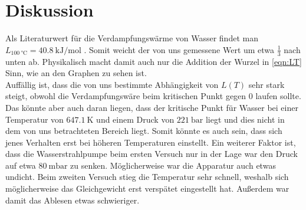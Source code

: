 \documentclass[
  bibliography=totoc,     %
  captions=tableheading,  %
  titlepage=firstiscover, %
]{scrartcl}
\begin{document}
\section{Diskussion}
Als Literaturwert für die Verdampfungswärme von Wasser findet man
$L_{\SI{100}{\celsius}} = \SI{40.8}{\kilo\joule\per\mol}$ \cite{chemst}.
Somit weicht der von uns gemessene Wert um etwa $\frac{1}{3}$ nach unten ab.
Physikalisch macht damit auch nur die Addition der Wurzel in \eqref{eqn:LT} Sinn, wie an den Graphen zu sehen ist.\\
Auffällig ist, dass die von uns bestimmte Abhängigkeit von $L \left( T \right)$ sehr stark steigt, obwohl die
Verdampfungswäre beim kritischen Punkt gegen 0 laufen sollte.
Das könnte aber auch daran liegen, dass der kritische Punkt für Wasser bei einer Temperatur
von $\SI{647.1}{\kelvin}$ und einem Druck von $\SI{221}{\bar}$ liegt \cite{chemth} und dies
nicht in dem von uns betrachteten Bereich liegt. Somit könnte es auch sein, dass sich
jenes Verhalten erst bei höheren Temperaturen einstellt.
Ein weiterer Faktor ist, dass die Wasserstrahlpumpe beim ersten Versuch nur in der Lage
war den Druck auf etwa $\SI{80}{\milli\bar}$ zu senken.
Möglicherweise war die Apparatur auch etwas undicht.
Beim zweiten Versuch stieg die Temperatur sehr schnell, weshalb sich möglicherweise das
Gleichgewicht erst verspätet eingestellt hat. Außerdem war damit das Ablesen etwas schwieriger.
\nocite{*}
\printbibliography
\end{document}
